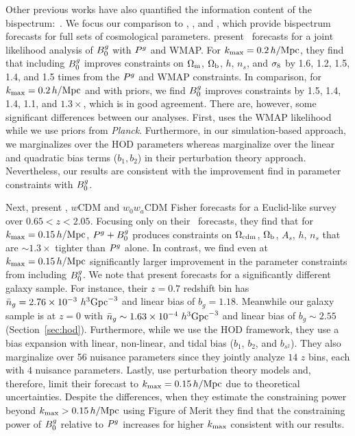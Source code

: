 Other previous works have also quantified the information content of the
bispectrum:~\citep[\eg][]{scoccimarro2004, sefusatti2006, sefusatti2007,
song2015, tellarini2016, yamauchi2017a, karagiannis2018, yankelevich2019,
chudaykin2019, coulton2019, reischke2019}. 
We focus our comparison to \cite{sefusatti2006}, \cite{yankelevich2019}, 
and \cite{chudaykin2019}, which provide bispectrum forecasts for full sets of
cosmological parameters.
\cite{sefusatti2006} present \lcdm~forecasts for a joint likelihood analysis of
$B^g_0$ with $P^g$ and WMAP. For $k_{\rm max} = 0.2\,h/\mathrm{Mpc}$, they find that including
$B^g_0$ improves constraints on $\Omega_{\rm m}$, $\Omega_{\rm b}$, $h$, $n_s$, and $\sigma_8$ by 1.6, 1.2,
1.5, 1.4, and 1.5 times from the $P^g$ and WMAP constraints. In comparison, for 
$k_{\rm max} = 0.2\,h/\mathrm{Mpc}$ and with \planck priors, we find $B^g_0$ improves constraints
by  1.5, 1.4, 1.4, 1.1, and $1.3\times$, which is in good agreement. There are,
however, some significant differences between our analyses. First, \cite{sefusatti2006} 
uses the WMAP likelihood while we use priors from {\em Planck}. Furthermore, 
in our simulation-based approach, we marginalizes over the HOD parameters
whereas \cite{sefusatti2006} marginalize over the linear and quadratic bias
terms ($b_1, b_2$) in their perturbation theory approach. Nevertheless, our
results are consistent with the improvement \cite{sefusatti2006} find in
parameter constraints with $B^g_0$. 

Next, \cite{yankelevich2019} present \lcdm, $w$CDM and $w_0w_a$CDM Fisher
forecasts for a Euclid-like survey\cite{laureijs2011} over $0.65 < z < 2.05$.
Focusing only on their \lcdm~forecasts, they find that for $k_{\rm max} = 0.15\,h/\mathrm{Mpc}$, 
$P^g+B^g_0$ produces constraints on $\Omega_{\rm cdm}$, $\Omega_{\rm b}$, $A_s$, $h$, $n_s$ 
that are ${\sim}1.3\times$ tighter than $P^g$ alone. In contrast, we find even
at $k_{\rm max}=0.15\,h/\mathrm{Mpc}$ significantly larger improvement in the parameter constraints 
from including $B^g_0$. We note that \cite{yankelevich2019} present forecasts for
a significantly different galaxy sample. For instance, their $z = 0.7$ redshift
bin has $\bar{n}_g = 2.76 \times 10^{-3}~h^3{\rm Gpc}^{-3}$ and linear bias of
$b_g = 1.18$. Meanwhile our galaxy sample is at $z=0$ with $\bar{n}_g \sim 1.63\times
10^{-4}~h^3{\rm Gpc}^{-3}$ and linear bias of $b_g \sim 2.55$
(Section~\ref{sec:hod}). Furthermore, while we use the HOD framework, they use
a bias expansion with linear, non-linear, and tidal bias ($b_1$, $b_2$, and
$b_{s^2}$). They also marginalize over 56 nuisance parameters since they
jointly analyze $14$ $z$ bins, each with $4$ nuisance parameters.  Lastly,
\cite{yankelevich2019} use perturbation theory models and, therefore, limit
their forecast to $k_{\rm max} = 0.15\,h/\mathrm{Mpc}$ due
to theoretical uncertainties. Despite the differences, when they estimate the constraining
power beyond $k_{\rm max} > 0.15\,h/\mathrm{Mpc}$ using Figure of Merit they find that the
constraining power of $B^g_0$ relative to $P^g$ increases for higher $k_{\rm max}$
consistent with our results. 

